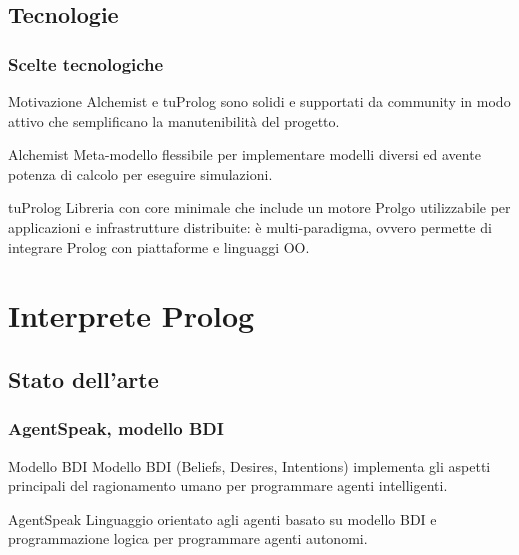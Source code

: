\documentclass[handout]{beamer}\mode<presentation>{\usetheme{AMSCesenaBleu}}
\begin{document}
\subsection{Tecnologie}
\begin{frame}
\frametitle{Scelte tecnologiche}
\begin{block}{Motivazione}
Alchemist e tuProlog sono solidi e supportati da community in modo attivo che semplificano la manutenibilità del progetto. 
\end{block}

\begin{block}{Alchemist}
Meta-modello flessibile per implementare modelli diversi ed avente potenza di calcolo per eseguire simulazioni.
\end{block}

\begin{block}{tuProlog}
Libreria con core minimale che include un motore Prolgo utilizzabile per applicazioni e infrastrutture distribuite: è multi-paradigma, ovvero permette di integrare Prolog con piattaforme e linguaggi OO.
\end{block}
\end{frame}



\section{Interprete Prolog}

\subsection{Stato dell'arte}
\begin{frame}
\frametitle{AgentSpeak, modello BDI}
\begin{block}{Modello BDI}
Modello BDI (Beliefs, Desires, Intentions) implementa gli aspetti principali del ragionamento umano per programmare agenti intelligenti.
\end{block}
\begin{block}{AgentSpeak}
Linguaggio orientato agli agenti basato su modello BDI e programmazione logica per programmare agenti autonomi.
\end{block}
\end{frame}
\end{document}
